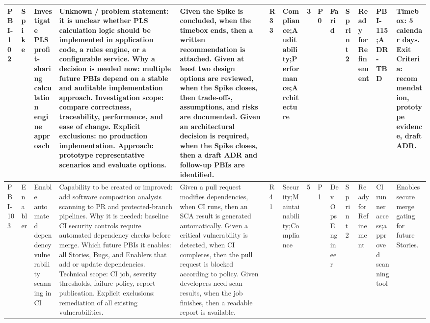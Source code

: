 \documentclass[11pt,a4paper]{article}
\begin{document}
\begin{landscape}
\begin{longtable}{|p{1.5cm}|p{1.3cm}|p{3.6cm}|p{4.6cm}|p{5.0cm}|p{1.5cm}|p{2.0cm}|p{1.1cm}|p{1.0cm}|p{1.7cm}|p{1.3cm}|p{1.8cm}|p{2.3cm}|p{3.0cm}|}
PBI-102 &
Spike &
Investigate PLS profit-sharing calculation engine approach &
Unknown / problem statement: it is unclear whether PLS calculation logic should be implemented in application code, a rules engine, or a configurable service. Why a decision is needed now: multiple future PBIs depend on a stable and auditable implementation approach. Investigation scope: compare correctness, traceability, performance, and ease of change. Explicit exclusions: no production implementation. Approach: prototype representative scenarios and evaluate options. &
Given the Spike is concluded, when the timebox ends, then a written recommendation is attached. Given at least two design options are reviewed, when the Spike closes, then trade-offs, assumptions, and risks are documented. Given an architectural decision is required, when the Spike closes, then a draft ADR and follow-up PBIs are identified. &
R33 &
Compliance;Auditability;Performance;Architecture &
3 &
P0 &
Farid &
Sprint 2 &
Ready for Refinement &
PBI-115;ADR-TBD &
Timebox: 5 calendar days. Exit Criteria: recommendation, prototype evidence, draft ADR. \\
\hline

PBI-103 &
Enabler &
Enable automated dependency vulnerability scanning in CI &
Capability to be created or improved: add software composition analysis scanning to PR and protected-branch pipelines. Why it is needed: baseline CI security controls require automated dependency checks before merge. Which future PBIs it enables: all Stories, Bugs, and Enablers that add or update dependencies. Technical scope: CI job, severity thresholds, failure policy, report publication. Explicit exclusions: remediation of all existing vulnerabilities. &
Given a pull request modifies dependencies, when CI runs, then an SCA result is generated automatically. Given a critical vulnerability is detected, when CI completes, then the pull request is blocked according to policy. Given developers need scan results, when the job finishes, then a readable report is available. &
R41 &
Security;Maintainability;Compliance &
5 &
P1 &
DevOps Engineer &
Sprint 2 &
Ready for Refinement &
CI runner access;approved scanning tool &
Enables secure merge gating for future Stories. \\
\hline


\end{longtable}
\end{landscape}
\end{document}

